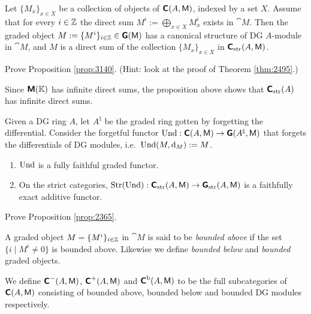 \begin{prop} \label{prop:3140}
Let $\{ M_x \}_{x \in X}$ be a collection of objects of
$\boldsymbol{\mathsf{C}}(A, \operatorname{\mathsf{M}})$, indexed by a set $X$. Assume that for every $i \in \mathbb{Z}$ 
the direct sum $M^i := \bigoplus_{x \in X} M^i_x$ 
exists in $\cat{M}$. Then the graded object 
$M := \{ M^i \}_{i \in \mathbb{Z}} \in \boldsymbol{\mathsf{G}}(\operatorname{\mathsf{M}})$ 
has a canonical structure of DG $A$-module in $\cat{M}$, 
and $M$ is a direct sum of the collection $\{ M_x \}_{x \in X}$
in $\boldsymbol{\mathsf{C}}_{\mathrm{str}}(A, \operatorname{\mathsf{M}})$. 
\end{prop}

\begin{exer} \label{exer:3140}
Prove Proposition \ref{prop:3140}. 
(Hint: look at the proof of Theorem \ref{thm:2495}.)
\end{exer}

\begin{exa} \label{exa:2367}
Since $\boldsymbol{\mathsf{M}}(\mathbb{K})$ has infinite direct sums, the proposition above shows that 
$\boldsymbol{\mathsf{C}}_{\mathrm{str}}(A)$ has infinite direct sums. 
\end{exa}

\begin{prop} \label{prop:2365}
Given a DG ring $A$, let $A^{\natural}$ be the graded ring gotten by forgetting 
the differential. Consider the forgetful functor 
$\operatorname{Und} : \boldsymbol{\mathsf{C}}(A, \operatorname{\mathsf{M}}) \to \boldsymbol{\mathsf{G}}(A^{\natural}, \operatorname{\mathsf{M}})$
that forgets the differentials of DG modules, i.e.\ 
$\operatorname{Und}(M, \mathrm{d}_M) :=  M$.
\begin{enumerate}
\item $\operatorname{Und}$ is a fully faithful graded functor.

\item On the strict categories, 
$\operatorname{Str}(\operatorname{Und}) :  \boldsymbol{\mathsf{C}}_{\mathrm{str}}(A, \operatorname{\mathsf{M}}) \to 
\boldsymbol{\mathsf{G}}_{\mathrm{str}}(A, \operatorname{\mathsf{M}})$
is a faithfully exact additive functor.
\end{enumerate} 
\end{prop}

\begin{exer} \label{exer:2367}
Prove Proposition \ref{prop:2365}.
\end{exer}

A graded object $M = \{ M^i \}_{i \in \mathbb{Z}}$ in $\cat{M}$ is said to be {\em
bounded above} if the set $\{ i \mid M^i \neq 0 \}$ is bounded above. 
Likewise we define {\em bounded below} and {\em bounded} graded objects. 

\begin{dfn} \label{dfn:3220}
We define $\boldsymbol{\mathsf{C}}^-(A, \operatorname{\mathsf{M}})$, $\boldsymbol{\mathsf{C}}^+(A, \operatorname{\mathsf{M}})$ and 
$\boldsymbol{\mathsf{C}}^{\mathrm{b}}(A, \operatorname{\mathsf{M}})$ to be the full subcategories of 
$\boldsymbol{\mathsf{C}}(A, \operatorname{\mathsf{M}})$ consisting of bounded above, bounded below and bounded
DG modules respectively. 
\end{dfn}

